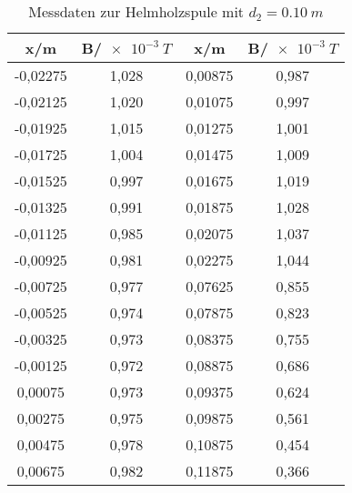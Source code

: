 

\begin{table}[h!]
  \centering
  \caption{Messdaten zur Helmholzspule mit $d_{2}=\SI{0.10}{m}$}
  \label{tab:h10}
  \begin{tabular}{c c c c}
    \toprule
     x/m &	 B/$\SI{e-3}{T}$	& x/m &	 B/$\SI{e-3}{T}$   \\
    \midrule
   -0,02275	  & 1,028   &   0,00875	  & 0,987\\
   -0,02125	  & 1,020   &   0,01075	  & 0,997\\
   -0,01925	  & 1,015   &   0,01275	  & 1,001\\
   -0,01725	  & 1,004   &   0,01475	  & 1,009\\
   -0,01525	  & 0,997   &   0,01675	  & 1,019\\
   -0,01325	  & 0,991   &   0,01875	  & 1,028\\
   -0,01125	  & 0,985   &   0,02075	  & 1,037\\
   -0,00925	  & 0,981   &   0,02275	  & 1,044\\
   -0,00725	  & 0,977   &   0,07625	  & 0,855\\
   -0,00525	  & 0,974   &   0,07875	  & 0,823\\
   -0,00325	  & 0,973   &   0,08375	  & 0,755\\
   -0,00125	  & 0,972   &   0,08875	  & 0,686\\
    0,00075	  & 0,973   &   0,09375	  & 0,624\\
    0,00275	  & 0,975   &   0,09875	  & 0,561\\
    0,00475	  & 0,978   &   0,10875	  & 0,454\\
    0,00675	  & 0,982   &   0,11875	  & 0,366\\

    \bottomrule
  \end{tabular}
\end{table}
